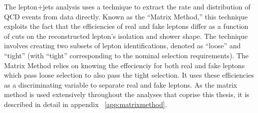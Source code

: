 The lepton+jets analysis uses a technique to extract the rate and distribution of QCD events from data directly.
Known as the ``Matrix Method,'' this technique exploits the fact that the efficiencies of real and fake leptons differ as a function of cuts on the reconstructed lepton's isolation and shower shape.
The technique involves creating two subsets of lepton identifications, denoted as ``loose'' and ``tight'' (with ``tight'' corresponding to the nominal selection requirements).
The Matrix Method relies on knowing the effecienciy for both real and fake leptons which pass loose selection to also pass the tight selection.
It uses these efficiencies as a discriminating variable to separate real and fake leptons.
As the matrix method is used extensively throughout the analyses that coprise this thesis, it is described in detail in appendix ~\ref{app:matrixmethod}.





